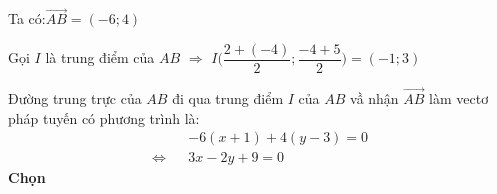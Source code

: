 \begin{loigiaiex}{12}
  \par Ta có:$\overrightarrow {AB}=(-6;4)$ \par Gọi $I$ là trung điểm của $AB$ $\Rightarrow $ $I\bigg (\dfrac {2+(-4)}{2};\dfrac {-4+5}{2}\bigg )=(-1;3)$ \par Đường trung trực của $AB$ đi qua trung điểm $I$ của $AB$ vầ nhận $\overrightarrow {AB}$ làm vectơ pháp tuyến có phương trình là: \begin {eqnarray*} && -6(x+1)+4(y-3)=0\\ \Leftrightarrow && 3x-2y+9=0 \end {eqnarray*}  \phantom {a}\hfill {\bfseries \sffamily Chọn~} 
\end{loigiaiex}
